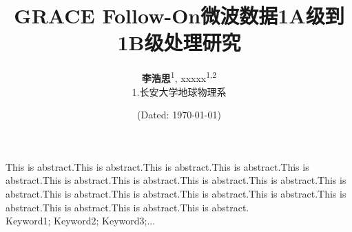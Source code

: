 \documentclass[hyperref]{ctexart}
\title{\textbf{GRACE Follow-On微波数据1A级到1B级处理研究}}
\author{
    {\textbf{李浩思}\textsuperscript{1}, xxxxx\textsuperscript{1,2}}\\
    1.长安大学地球物理系
}
\date{(Dated: \today)}
\begin{document}
    \maketitle
        This is abstract.This is abstract.This is abstract.This is abstract.This is abstract.This is abstract.This is abstract.This is abstract.This is abstract.This is abstract.This is abstract.This is abstract.This is abstract.This is abstract.This is abstract.This is abstract.This is abstract.This is abstract.\\
        
        Keyword1; Keyword2; Keyword3;...
\end{document}
